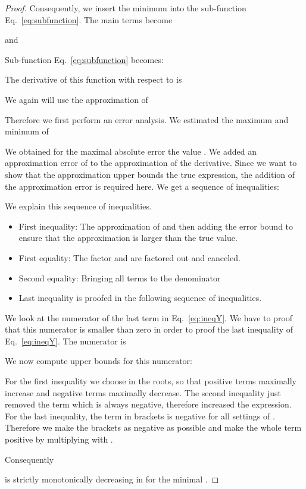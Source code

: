 \documentclass{article}
\begin{document}
\begin{proof}
Consequently, we insert the minimum  into the  sub-function
Eq.~\eqref{eq:subfunction}. The main terms become

and

Sub-function
Eq.~\eqref{eq:subfunction} becomes:

The derivative of this function with respect to  is


We again will use the approximation of \citet{Ren:07}

Therefore we first perform an error analysis.
We estimated the maximum and minimum of 

We obtained for the maximal absolute error the value .
We added an approximation 
error of  to the approximation of the derivative.
Since we want to show that the approximation upper bounds the true
expression, the addition of the approximation error is required here.
We get a sequence of inequalities:



We explain this sequence of inequalities.
\begin{itemize}
\item First inequality: The approximation of \citet{Ren:07}
and then adding the error bound to ensure that the approximation
is larger than the true value.

\item First equality: The factor  and 
  are factored out and canceled.

\item Second equality: Bringing all terms to the denominator


\item Last inequality  is proofed in the following sequence of
  inequalities.
\end{itemize}
We look at the numerator of the last term in Eq.~\eqref{eq:ineqY}. We
have to proof that this numerator is smaller than zero in order to
proof the last inequality of  Eq.~\eqref{eq:ineqY}.
The numerator is

We now compute upper bounds for this numerator:


For the first inequality we choose  in the roots, so that 
positive terms maximally increase and negative terms maximally decrease.
The second inequality just removed the  term which is always
negative, therefore increased the expression.
For the last inequality, the term in brackets 
is negative for all settings of . 
Therefore we make the brackets as negative as possible 
and make the whole term positive by multiplying with .

Consequently 

is strictly monotonically decreasing in  for the minimal
. 
\end{proof}
\end{document}
